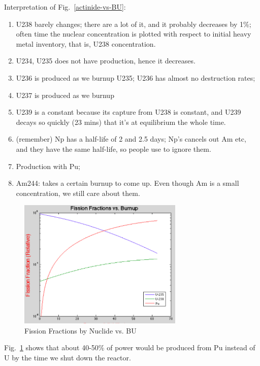 \documentclass{school-22.211-notes}
\begin{document}
Interpretation of Fig.~\ref{actinide-vs-BU}: 
\begin{enumerate}
\item U238 barely changes; there are a lot of it, and it probably
  decreases by 1\%; often time the nuclear concentration is plotted
  with respect to initial heavy metal inventory, that is, U238
  concentration.
\item U234, U235 does not have production, hence it decreases. 
\item U236 is produced as we burnup U235; U236 has almost no
  destruction rates;
\item U237 is produced as we burnup 
\item U239 is a constant because its capture from U238 is constant,
  and U239 decays so quickly (23 mins) that it's at equilibrium the
  whole time.
\item (remember) Np has a half-life of 2 and 2.5 days; Np's cancels
  out Am etc, and they have the same half-life, so people use to
  ignore them.
\item Production with Pu; 
\item Am244: takes a certain burnup to come up. Even though Am is a
  small concentration, we still care about them.
\end{enumerate}
\begin{figure}
  \centering
  \includegraphics[width=0.7\textwidth]{images/dfs/ff-vs-BU.png}
  \caption{Fission Fractions by Nuclide vs. BU} \label{ff-vs-BU}
\end{figure}
Fig.~\ref{ff-vs-BU} shows that about 40-50\% of power would be
produced from Pu instead of U by the time we shut down the reactor.
\end{document}
